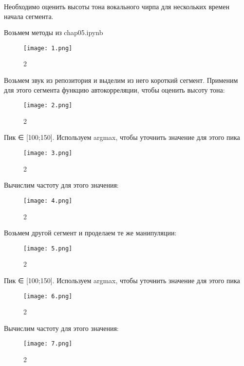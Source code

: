 \documentclass[10pt,a4paper,oneside]{article}
\begin{document}
Необходимо оценить высоты тона вокального чирпа для нескольких времен начала сегмента.

Возьмем методы из chap05.ipynb

\begin{figure}[H]
        \centering
        \texttt{[image: 1.png]}
        \caption{2}
        \label{fig:first}
\end{figure}

Возьмем звук из репозитория и выделим из него короткий сегмент. Применим для этого сегмента функцию автокорреляции, чтобы оценить высоту тона: 

\begin{figure}[H]
        \centering
        \texttt{[image: 2.png]}
        \caption{2}
        \label{fig:first}
\end{figure}

Пик ∈ [100;150]. Используем argmax, чтобы уточнить значение для этого пика

\begin{figure}[H]
        \centering
        \texttt{[image: 3.png]}
        \caption{2}
        \label{fig:first}
\end{figure}
Вычислим частоту для этого значения: 

\begin{figure}[H]
        \centering
        \texttt{[image: 4.png]}
        \caption{2}
        \label{fig:first}
\end{figure}

Возьмем другой сегмент и проделаем те же манипуляции: 

\begin{figure}[H]
        \centering
        \texttt{[image: 5.png]}
        \caption{2}
        \label{fig:first}
\end{figure}

Пик ∈ [100;150]. Используем argmax, чтобы уточнить значение для этого пика

\begin{figure}[H]
        \centering
        \texttt{[image: 6.png]}
        \caption{2}
        \label{fig:first}
\end{figure}

Вычислим частоту для этого значения: 

\begin{figure}[H]
        \centering
        \texttt{[image: 7.png]}
        \caption{2}
        \label{fig:first}
\end{figure}
\end{document}
